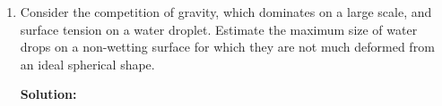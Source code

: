 \documentclass[10pt]{article}
\newenvironment{Solution}
    {\textbf{Solution:}
    
    \vspace{5mm}
    \begin{tcolorbox}
    }
    {
    \end{tcolorbox}
    \vspace{5mm}
    }
\begin{document}
\begin{enumerate}
\begin{enumerate}[resume]
\begin{Solution}

\end{Solution}

\item Consider the competition of gravity, which dominates on a large scale, and surface tension on a water droplet. Estimate the maximum size of water drops on a non-wetting surface for which they are not much deformed from an ideal spherical shape.

\begin{Solution}

\end{Solution}

    
\end{enumerate}
\end{enumerate}
\end{document}
